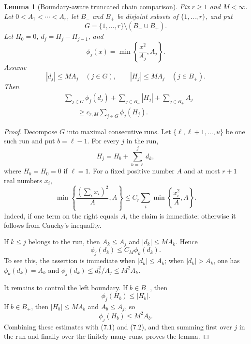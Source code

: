 \documentclass[11pt]{article}
\newtheorem{lemma}[theorem]{Lemma}
\theoremstyle{remark}
\begin{document}
\begin{lemma}[Boundary-aware truncated chain comparison]
\label{lem:boundary-truncated-chain}
Fix \(r\ge1\) and \(M<\infty\).  Let
\(0<A_1<\cdots<A_r\), let \(B_-\) and \(B_+\) be disjoint subsets of
\(\{1,\ldots,r\}\), and put
\[
        G=\{1,\ldots,r\}\setminus(B_-\cup B_+).
\]
Let \(H_0=0\), \(d_j=H_j-H_{j-1}\), and
\[
        \phi_j(x)=\min\left\{\frac{x^2}{A_j},A_j\right\}.
\]
Assume
\[
        |d_j|\le M A_j\quad(j\in G),
        \qquad
        |H_j|\le M A_j\quad(j\in B_+).
\]
Then
\[
\begin{aligned}
&\sum_{j\in G}\phi_j(d_j)
 +\sum_{j\in B_-}|H_j|
 +\sum_{j\in B_+}A_j\\
&\qquad\ge c_{r,M}
 \sum_{j\in G}\phi_j(H_j).
\end{aligned}
\]
\end{lemma}

\begin{proof}
Decompose \(G\) into maximal consecutive runs.  Let
\(\{\ell,\ell+1,\ldots,u\}\) be one such run and put
\(b=\ell-1\).  For every \(j\) in the run,
\[
        H_j=H_b+\sum_{k=\ell}^j d_k,
\]
where \(H_b=H_0=0\) if \(\ell=1\).  For a fixed positive number \(A\) and
at most \(r+1\) real numbers \(x_i\),
\[
        \min\left\{\frac{(\sum_i x_i)^2}{A},A\right\}
        \le C_r\sum_i
        \min\left\{\frac{x_i^2}{A},A\right\}.
        \tag{7.1}
\]
Indeed, if one term on the right equals \(A\), the claim is immediate; otherwise
it follows from Cauchy's inequality.

If \(k\le j\) belongs to the run, then \(A_k\le A_j\) and
\(|d_k|\le M A_k\).  Hence
\[
        \phi_j(d_k)\le C_M\phi_k(d_k).
        \tag{7.2}
\]
To see this, the assertion is immediate when \(|d_k|\le A_k\); when
\(|d_k|>A_k\), one has
\(\phi_k(d_k)=A_k\) and
\(\phi_j(d_k)\le d_k^2/A_j\le M^2A_k\).

It remains to control the left boundary.  If \(b\in B_-\), then
\[
        \phi_j(H_b)\le |H_b|.
\]
If \(b\in B_+\), then \(|H_b|\le M A_b\) and \(A_b\le A_j\), so
\[
        \phi_j(H_b)\le M^2 A_b.
\]
Combining these estimates with (7.1) and (7.2), and then summing first over
\(j\) in the run and finally over the finitely many runs, proves the lemma.
\end{proof}
\end{document}

